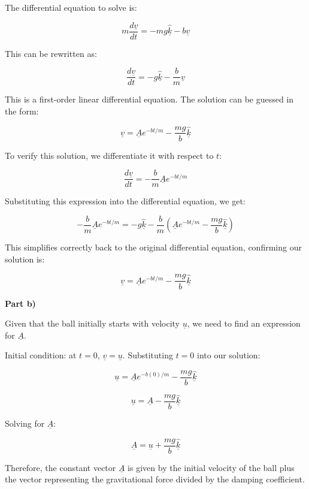 \documentclass[a4paper,11pt]{article}
\begin{document}
The differential equation to solve is:

\[ m\frac{d\underline{v}}{dt} = - mg \hat{\underline{k}} - b\underline{v} \]

This can be rewritten as:

\[ \frac{d\underline{v}}{dt} = - g \hat{\underline{k}} - \frac{b}{m}\underline{v} \]

This is a first-order linear differential equation. The solution can be guessed in the form:

\[ \underline{v} = \underline{A} e^{-bt/m} - \frac{mg}{b} \hat{\underline{k}} \]

To verify this solution, we differentiate it with respect to \(t\):

\[ \frac{d\underline{v}}{dt} = -\frac{b}{m} \underline{A} e^{-bt/m} \]

Substituting this expression into the differential equation, we get:

\[ -\frac{b}{m} \underline{A} e^{-bt/m} = - g \hat{\underline{k}} - \frac{b}{m}\left( \underline{A} e^{-bt/m} - \frac{mg}{b} \hat{\underline{k}} \right) \]

This simplifies correctly back to the original differential equation, confirming our solution is:

\[ \underline{v} = \underline{A} e^{-bt/m} - \frac{mg}{b} \hat{\underline{k}} \]

\textbf{Part b)}

Given that the ball initially starts with velocity \(\underline{u}\), we need to find an expression for \(\underline{A}\).

Initial condition: at \(t = 0\), \(\underline{v} = \underline{u}\). Substituting \(t = 0\) into our solution:

\[ \underline{u} = \underline{A} e^{-b(0)/m} - \frac{mg}{b} \hat{\underline{k}} \]

\[ \underline{u} = \underline{A} - \frac{mg}{b} \hat{\underline{k}} \]

Solving for \(\underline{A}\):

\[ \underline{A} = \underline{u} + \frac{mg}{b} \hat{\underline{k}} \]

Therefore, the constant vector \(\underline{A}\) is given by the initial velocity of the ball plus the vector representing the gravitational force divided by the damping coefficient.
\end{document}
